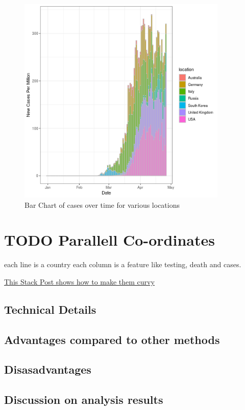 \documentclass[11pt]{article}
\begin{document}
\begin{figure}[htbp]
\centering
\includegraphics[width=10cm]{barex.png}
\caption{\label{fig:orgb98a5df}Bar Chart of cases over time for various locations}
\end{figure}



\section{{\bfseries\sffamily TODO} Parallell Co-ordinates}
\label{sec:org308e500}
each line is a country
each column is a feature like testing, death and cases.

\href{https://stackoverflow.com/a/35206832/10593632}{This Stack Post shows how to make them curvy}

\subsection{Technical Details}
\label{sec:org52765d5}
\subsection{Advantages compared to other methods}
\label{sec:orgc5a1c93}
\subsection{Disasadvantages}
\label{sec:org32dbe22}
\subsection{Discussion on analysis results}
\label{sec:orgbf57057}
\end{document}
